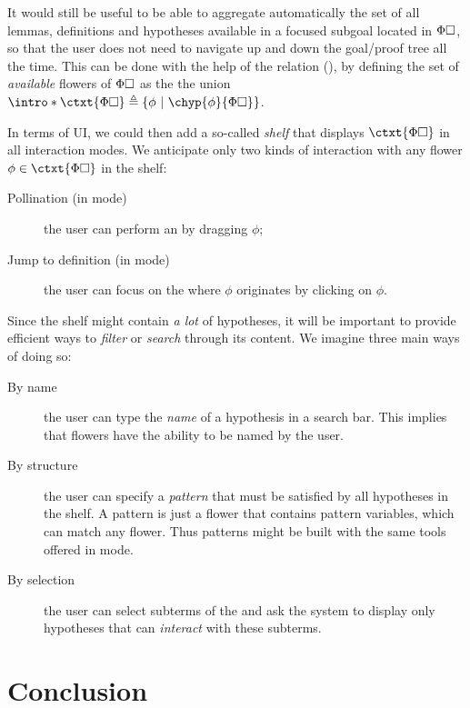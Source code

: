 \begin{scope}
\AP
It would still be useful to be able to aggregate automatically the set of all
lemmas, definitions and hypotheses available in a focused subgoal located in
$\Phi\square$, so that the user does not need to navigate up and down the
goal/proof tree all the time. This can be done with the help of the
 relation (), by defining the set of
\emph{available} flowers of $\Phi\square$ as the the union
$\intro*\ctxt{\Phi\hole} \defeq \compr{\phi}{\chyp{\phi}{\Phi\hole}}$.

In terms of UI, we could then add a so-called \emph{shelf} that displays
$\ctxt{\Phi\hole}$ in all interaction modes. We anticipate only two kinds of
interaction with any flower $\phi \in \ctxt{\Phi\hole}$ in the shelf:
\begin{description}
  \item[Pollination (in  mode)] the user can perform an
    by dragging $\phi$;
  \item[Jump to definition (in  mode)] the user can focus on
  the  where $\phi$ originates by clicking on $\phi$.
\end{description}

Since the shelf might contain \emph{a lot} of hypotheses, it will be important
to provide efficient ways to \emph{filter} or \emph{search} through its content.
We imagine three main ways of doing so:
\begin{description}
  \item[By name] the user can type the \emph{name} of a hypothesis in a
  search bar. This implies that flowers have the ability to be named by the
  user.
  \item[By structure] the user can specify a \emph{pattern} that must
  be satisfied by all hypotheses in the shelf. A pattern is just a flower that
  contains pattern variables, which can match any flower. Thus patterns might be
  built with the same tools offered in  mode.
  \item[By selection] the user can select subterms of the  and ask the
  system to display only hypotheses that can \emph{interact} with these
  subterms.
\end{description}


\section{Conclusion}


\end{scope}
